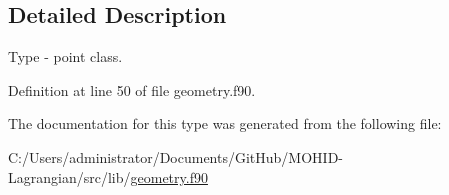 \subsection{Detailed Description}
Type -\/ point class. 

Definition at line 50 of file geometry.\+f90.



The documentation for this type was generated from the following file\+:\begin{DoxyCompactItemize}
\item 
C\+:/\+Users/administrator/\+Documents/\+Git\+Hub/\+M\+O\+H\+I\+D-\/\+Lagrangian/src/lib/\mbox{\hyperlink{geometry_8f90}{geometry.\+f90}}\end{DoxyCompactItemize}
